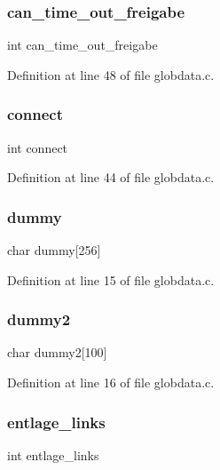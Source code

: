 \subsubsection{can\+\_\+time\+\_\+out\+\_\+freigabe}
{\footnotesize\ttfamily int can\+\_\+time\+\_\+out\+\_\+freigabe}



Definition at line 48 of file globdata.\+c.

\mbox{\label{globdata_8c_aa79ab26bef7962d86504a61edbc534a7}} 
\subsubsection{connect}
{\footnotesize\ttfamily int connect}



Definition at line 44 of file globdata.\+c.

\mbox{\label{globdata_8c_a4dc4bd65e1b61fabca89558c3d1109c7}} 
\subsubsection{dummy}
{\footnotesize\ttfamily char dummy[256]}



Definition at line 15 of file globdata.\+c.

\mbox{\label{globdata_8c_aa5c9fb090bba18f0a9e23bff98effff1}} 
\subsubsection{dummy2}
{\footnotesize\ttfamily char dummy2[100]}



Definition at line 16 of file globdata.\+c.

\mbox{\label{globdata_8c_a86bdb94fe65ca48f7262ddcd95570ff9}} 
\subsubsection{entlage\+\_\+links}
{\footnotesize\ttfamily int entlage\+\_\+links}



